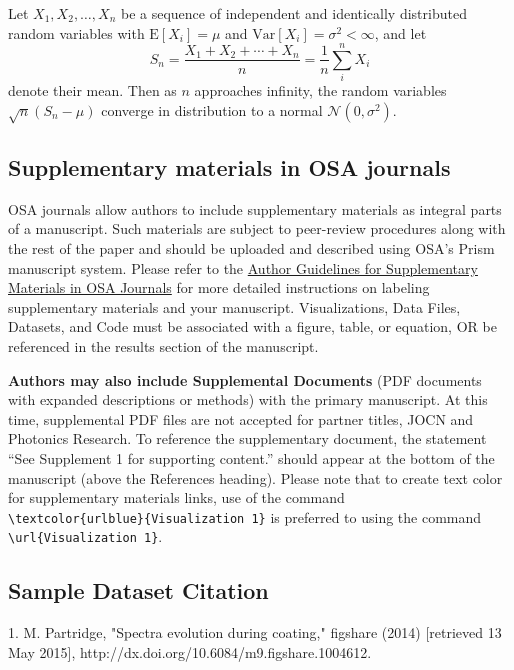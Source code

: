 \documentclass[9pt,twocolumn,twoside]{osajnl}
\begin{document}
Let $X_1, X_2, \ldots, X_n$ be a sequence of independent and identically distributed random variables with $\text{E}[X_i] = \mu$ and $\text{Var}[X_i] = \sigma^2 < \infty$, and let
\begin{equation}
S_n = \frac{X_1 + X_2 + \cdots + X_n}{n}
      = \frac{1}{n}\sum_{i}^{n} X_i
\label{eq:refname1}
\end{equation}
denote their mean. Then as $n$ approaches infinity, the random variables $\sqrt{n}(S_n - \mu)$ converge in distribution to a normal $\mathcal{N}(0, \sigma^2)$.


\subsection{Supplementary materials in OSA journals}
\citep{glover_hydrogen_2003} OSA journals allow authors to include supplementary materials as integral parts of a manuscript. Such materials are subject to peer-review procedures along with the rest of the paper and should be uploaded and described using OSA's Prism manuscript system. Please refer to the \href{https://www.opticsinfobase.org/submit/style/supplementary_materials.cfm}{Author Guidelines for Supplementary Materials in OSA Journals} for more detailed instructions on labeling supplementary materials and your manuscript. Visualizations, Data Files, Datasets, and Code must be associated with a figure, table, or equation, OR be referenced in the results section of the manuscript. 

\textbf{Authors may also include Supplemental Documents} (PDF documents with expanded descriptions or methods) with the primary manuscript. At this time, supplemental PDF files are not accepted for partner titles, JOCN and Photonics Research. To reference the supplementary document, the statement ``See Supplement 1 for supporting content.'' should appear at the bottom of the manuscript (above the References heading). Please note that to create text color for supplementary materials links, use of the command \\
\verb|\textcolor{urlblue}{Visualization 1}| is preferred to using the command\\
\verb|\url{Visualization 1}|.




\subsection{Sample Dataset Citation}

1. M. Partridge, "Spectra evolution during coating," figshare (2014) [retrieved 13 May 2015], http://dx.doi.org/10.6084/m9.figshare.1004612.
\end{document}
